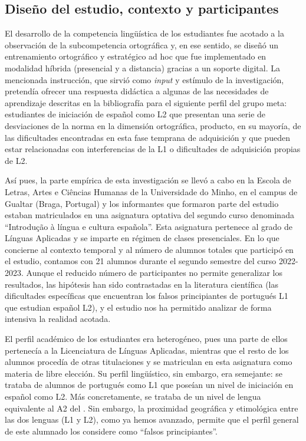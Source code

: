\documentclass[spanish]{textolivre}
\begin{document}
\subsection{Diseño del estudio, contexto y participantes}\label{sec-organizacao}
El desarrollo de la competencia lingüística de los estudiantes fue acotado a la observación de la subcompetencia ortográfica y, en ese sentido, se diseñó un entrenamiento ortográfico y estratégico ad hoc que fue implementado en modalidad híbrida (presencial y a distancia) gracias a un soporte digital. La mencionada instrucción, que sirvió como \textit{input} y estímulo de la investigación, pretendía ofrecer una respuesta didáctica a algunas de las necesidades de aprendizaje descritas en la bibliografía \cite{andrade_neta_aprender_2000,perez_ensenanza_2007,baerlocher_rocha_errores_2013,cardoso_interferencias_2022} para el siguiente perfil del grupo meta: estudiantes de iniciación de español como L2 que presentan una serie de desviaciones de la norma en la dimensión ortográfica, producto, en su mayoría, de las dificultades encontradas en esta fase temprana de adquisición y que pueden estar relacionadas con interferencias de la L1 o dificultades de adquisición propias de L2.  

Así pues, la parte empírica de esta investigación se llevó a cabo en la Escola de Letras, Artes e Ciências Humanas de la Universidade do Minho, en el campus de Gualtar (Braga, Portugal) y los informantes que formaron parte del estudio estaban matriculados en una asignatura optativa del segundo curso denominada “Introdução à língua e cultura española”. Esta asignatura pertenece al grado de Línguas Aplicadas y se imparte en régimen de clases presenciales. En lo que concierne al contexto temporal y al número de alumnos totales que participó en el estudio, contamos con 21 alumnos durante el segundo semestre del curso 2022-2023. Aunque el reducido número de participantes no permite generalizar los resultados, las hipótesis han sido contrastadas en la literatura científica (las dificultades específicas que encuentran los falsos principiantes de portugués L1 que estudian español L2), y el estudio nos ha permitido analizar de forma intensiva la realidad acotada.

El perfil académico de los estudiantes era heterogéneo, pues una parte de ellos pertenecía a la Licenciatura de Línguas Aplicadas, mientras que el resto de los alumnos procedía de otras titulaciones y se matriculan en esta asignatura como materia de libre elección. Su perfil lingüístico, sin embargo, era semejante: se trataba de alumnos de portugués como L1 que poseían un nivel de iniciación en español como L2. Más concretamente, se trataba de un nivel de lengua equivalente al A2 del \textcite{consejo_de_europa_marco_2001}. Sin embargo, la proximidad geográfica y etimológica entre las dos lenguas (L1 y L2), como ya hemos avanzado, permite que el perfil general de este alumnado los considere como “falsos principiantes”.
\end{document}
